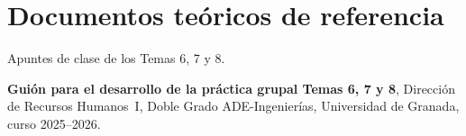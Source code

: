 \section*{Documentos teóricos de referencia}

\begin{enumerate}[label={[\arabic*]}, resume]

  \item Apuntes de clase de los Temas 6, 7 y 8.

  \item \textbf{Guión para el desarrollo de la práctica grupal Temas 6, 7 y 8},
        Dirección de Recursos Humanos~I, Doble Grado ADE-Ingenierías,
        Universidad de Granada, curso 2025--2026.

\end{enumerate}

\endinput
